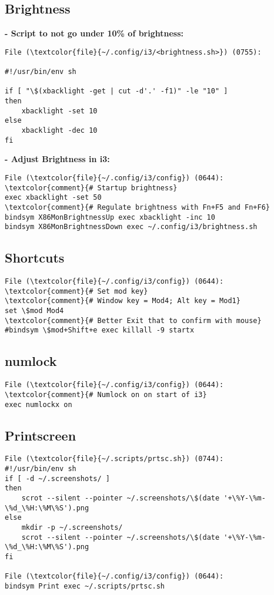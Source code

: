 \documentclass[10pt, a4paper, onecolumn, openany]{book}         %
\begin{document}
\subsection{Brightness}
\textbf{- Script to not go under 10\% of brightness:}
\begin{Verbatim}[commandchars=\\\{\}]
File (\textcolor{file}{~/.config/i3/<brightness.sh>}) (0755):

#!/usr/bin/env sh

if [ "\$(xbacklight -get | cut -d'.' -f1)" -le "10" ]
then
    xbacklight -set 10
else
    xbacklight -dec 10
fi
\end{Verbatim}
\textbf{- Adjust Brightness in i3:}
\begin{Verbatim}[commandchars=\\\{\}]
File (\textcolor{file}{~/.config/i3/config}) (0644):
\textcolor{comment}{# Startup brightness}
exec xbacklight -set 50
\textcolor{comment}{# Regulate brightness with Fn+F5 and Fn+F6}
bindsym X86MonBrightnessUp exec xbacklight -inc 10
bindsym X86MonBrightnessDown exec ~/.config/i3/brightness.sh
\end{Verbatim}

\subsection{Shortcuts}
\begin{Verbatim}[commandchars=\\\{\}]
File (\textcolor{file}{~/.config/i3/config}) (0644):
\textcolor{comment}{# Set mod key}
\textcolor{comment}{# Window key = Mod4; Alt key = Mod1}
set \$mod Mod4
\textcolor{comment}{# Better Exit that to confirm with mouse}
#bindsym \$mod+Shift+e exec killall -9 startx
\end{Verbatim}

\subsection{numlock}
\begin{Verbatim}[commandchars=\\\{\}]
File (\textcolor{file}{~/.config/i3/config}) (0644):
\textcolor{comment}{# Numlock on on start of i3}
exec numlockx on
\end{Verbatim}





\subsection{Printscreen}
\begin{Verbatim}[commandchars=\\\{\}]
File (\textcolor{file}{~/.scripts/prtsc.sh}) (0744):
#!/usr/bin/env sh
if [ -d ~/.screenshots/ ]
then
    scrot --silent --pointer ~/.screenshots/\$(date '+\%Y-\%m-\%d_\%H:\%M\%S').png
else
    mkdir -p ~/.screenshots/
    scrot --silent --pointer ~/.screenshots/\$(date '+\%Y-\%m-\%d_\%H:\%M\%S').png
fi

File (\textcolor{file}{~/.config/i3/config}) (0644):
bindsym Print exec ~/.scripts/prtsc.sh
\end{Verbatim}
\end{document}
